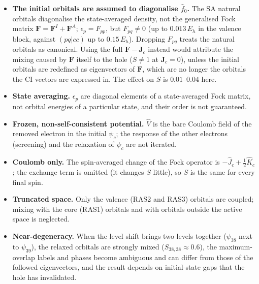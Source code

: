 \documentclass[11pt]{article}
\begin{document}
\begin{itemize}[leftmargin=*]
  \item \textbf{The initial orbitals are assumed to diagonalise $\hat f_0$.} The SA natural orbitals diagonalise the state-averaged density, not the generalised Fock matrix $\mathbf F = \mathbf F^{I} + \mathbf F^{A}$; $\epsilon_p = F_{pp}$, but $F_{pq} \neq 0$ (up to $0.013\,E_h$ in the valence block, against $(pq|cc)$ up to $0.15\,E_h$). Dropping $F_{pq}$ treats the natural orbitals as canonical. Using the full $\mathbf F - \mathbf J_c$ instead would attribute the mixing caused by $\mathbf F$ itself to the hole ($S\neq 1$ at $\mathbf J_c = 0$), unless the initial orbitals are redefined as eigenvectors of $\mathbf F$, which are no longer the orbitals the CI vectors are expressed in. The effect on $S$ is $0.01$--$0.04$ here.
  \item \textbf{State averaging.} $\epsilon_p$ are diagonal elements of a state-averaged Fock matrix, not orbital energies of a particular state, and their order is not guaranteed.
  \item \textbf{Frozen, non-self-consistent potential.} $\hat V$ is the bare Coulomb field of the removed electron in the initial $\psi_c$; the response of the other electrons (screening) and the relaxation of $\psi_c$ are not iterated.
  \item \textbf{Coulomb only.} The spin-averaged change of the Fock operator is $-\hat J_c + \tfrac12\hat K_c$; the exchange term is omitted (it changes $S$ little), so $S$ is the same for every final spin.
  \item \textbf{Truncated space.} Only the valence (RAS2 and RAS3) orbitals are coupled; mixing with the core (RAS1) orbitals and with orbitals outside the active space is neglected.
  \item \textbf{Near-degeneracy.} When the level shift brings two levels together ($\psi_{38}$ next to $\psi_{39}$), the relaxed orbitals are strongly mixed ($S_{38,38}\approx0.6$), the maximum-overlap labels and phases become ambiguous and can differ from those of the followed eigenvectors, and the result depends on initial-state gaps that the hole has invalidated.
\end{itemize}
\end{document}
